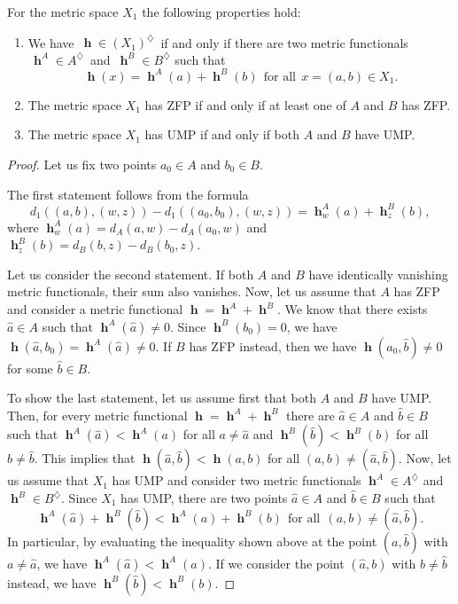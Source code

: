 \documentclass[10pt,a4paper]{amsart}
\DeclareMathOperator{\h}{\mathbf{h}} %
\begin{document}
\begin{proposition}  
For the metric space $X_1$ the following 
properties hold:
\begin{enumerate}
\item We have 
$\,\h \in (X_1)^\diamondsuit\,$ if and only 
if there are two metric functionals 
$\,\h^A\in A^\diamondsuit\,$ and 
$\,\h^B\in B^\diamondsuit$ such that
$$
\h(x) = \h^A(a) + \h^B(b)\ \ 
\text{for all}\ \ x=(a,b)\in X_1. 
$$
\item The metric space $X_1$ has ZFP if and 
only if at least one of $A$ and $B$ has ZFP.
\item The metric space $X_1$ has UMP if and 
only if both $A$ and $B$ have UMP.
\end{enumerate}
\end{proposition}

\begin{proof}
Let us fix two points $a_0\in A$ and 
$b_0\in B$. 

The first statement follows from the 
formula
$$d_1((a,b),(w,z)) - d_1((a_0,b_0),(w,z)) 
    = \h_{w}^{A}(a)+ \h_{z}^{B}(b),$$ 
where $\h_{w}^{A}(a)=d_A(a,w)-d_A(a_0,w)$ 
and $\h_{z}^{B}(b)=d_B(b,z)-d_B(b_0,z)$.     

Let us consider the second statement. 
If both $A$ and $B$ have identically 
vanishing metric functionals, their sum 
also vanishes. Now, let us assume that $A$ 
has ZFP and consider a metric functional 
$\h = \h^A + \h^B$. We know that there exists
$\hat{a} \in A$ such that 
$\h^A(\hat{a})\neq 0$. Since $\h^B(b_0)=0$, 
we have 
$\h(\hat{a},b_0) = \h^A(\hat{a}) \neq 0$.
If $B$ has ZFP instead, then we have
$\h(a_0,\hat{b})\neq 0$ for some 
$\hat{b}\in B$.    

To show the last statement, let us assume 
first that both $A$ and $B$ have UMP. Then, 
for every metric functional $\h = \h^A + \h^B$
there are $\hat{a}\in A$ and $\hat{b}\in B$
such that $\h^A(\hat{a}) < \h^A(a)$ for all 
$a\neq \hat{a}$ and $\h^B(\hat{b}) < \h^B(b)$ 
for all $b\neq \hat{b}$. This implies that
$\h(\hat{a},\hat{b}) < \h(a,b)$ for all 
$(a,b) \neq (\hat{a},\hat{b})$. Now, let us 
assume that $X_1$ has UMP and consider two 
metric functionals $\h^A\in A^\diamondsuit$ 
and $\h^B\in B^\diamondsuit$. Since $X_1$ has
UMP, there are two points $\hat{a}\in A$ and 
$\hat{b}\in B$ such that 
$$
\h^A(\hat{a})+\h^B(\hat{b}) 
< \h^A(a)+\h^B(b)\ \ \text{for all}\ \ 
(a, b)\neq (\hat{a}, \hat{b}). 
$$
In particular, by evaluating the inequality
shown above at the point $(a,\hat{b})$ with 
$a\neq \hat{a}$, we have 
$\h^A(\hat{a}) < \h^A(a)$. If we consider
the point $(\hat{a},b)$ with $b\neq \hat{b}$ 
instead, we have $\h^B(\hat{b}) < \h^B(b)$.
\end{proof}
\end{document}
